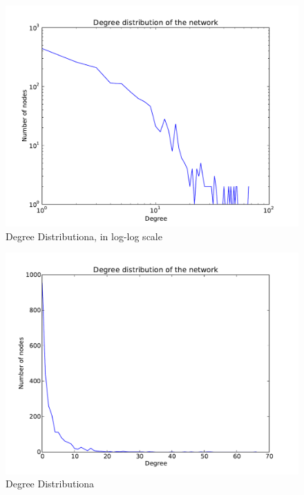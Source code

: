 \documentclass[a4paper,11pt]{article}
\begin{document}
\begin{figure}[htbp]
    \begin{center}
        \includegraphics[scale=0.4]{img/ddlog.pdf}
        \caption{Degree Distributiona, in log-log scale}
        \label{ddlog}
    \end{center}
\end{figure}
\begin{figure}[htbp]
    \begin{center}
        \includegraphics[scale=0.4]{img/dd.pdf}
        \caption{Degree Distributiona}
        \label{dd}
    \end{center}
\end{figure}
\end{document}
